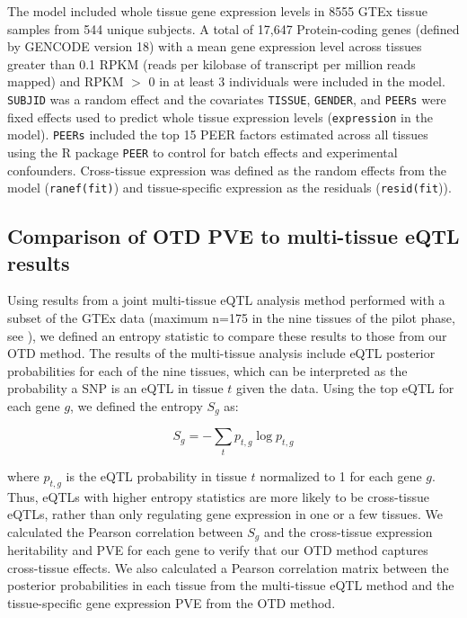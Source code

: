 \documentclass[10pt,letterpaper]{article}
\begin{document}
The model included whole tissue gene expression levels in 8555 GTEx
tissue samples from 544 unique subjects. A total of 17,647
Protein-coding genes (defined by GENCODE \cite{Harrow_2012} version 18) with a
mean gene expression level across tissues greater than 0.1 RPKM (reads
per kilobase of transcript per million reads mapped) and RPKM $>$ 0 in at least 3 individuals were included in
the model. \texttt{SUBJID} was a random effect and the covariates
\texttt{TISSUE}, \texttt{GENDER}, and \texttt{PEERs} were fixed effects
used to predict whole tissue expression levels (\texttt{expression} in
the model). \texttt{PEERs} included the top 15 PEER factors estimated
across all tissues using the R package \texttt{PEER} \cite{Stegle_2012} to control
for batch effects and experimental confounders. Cross-tissue expression
was defined as the random effects from the model (\texttt{ranef(fit)})
and tissue-specific expression as the residuals (\texttt{resid(fit})).

\subsection*{Comparison of OTD PVE to multi-tissue eQTL
results}\label{comparison-of-otd-pve-to-multi-tissue-eqtl-results}

Using results from a joint multi-tissue eQTL analysis method \cite{Flutre_2013}
performed with a subset of the GTEx data (maximum n=175 in the nine
tissues of the pilot phase, see \cite{Ardlie_2015}), we defined an entropy
statistic to compare these results to those from our OTD method. The
results of the multi-tissue analysis include eQTL posterior
probabilities for each of the nine tissues, which can be interpreted as
the probability a SNP is an eQTL in tissue \(t\) given the data. Using
the top eQTL for each gene \(g\), we defined the entropy \(S_g\) as:

\[ S_g = -\sum_{t}p_{t,g} \log p_{t,g} \]

where \(p_{t,g}\) is the eQTL probability in tissue \(t\) normalized to
1 for each gene \(g\). Thus, eQTLs with higher entropy statistics are
more likely to be cross-tissue eQTLs, rather than only regulating gene
expression in one or a few tissues. We calculated the Pearson
correlation between \(S_g\) and the cross-tissue expression heritability
and PVE for each gene to verify that our OTD method captures
cross-tissue effects. We also calculated a Pearson correlation matrix
between the posterior probabilities in each tissue from the multi-tissue
eQTL method and the tissue-specific gene expression PVE from the OTD
method.
\end{document}
